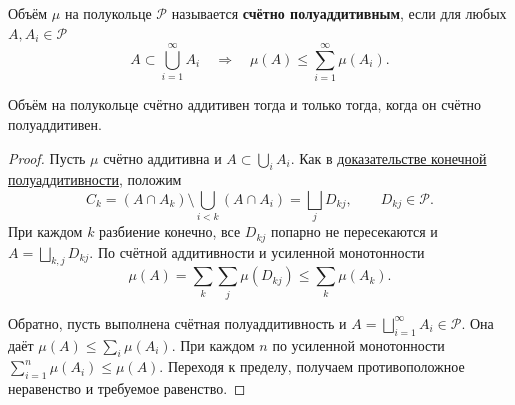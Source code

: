 \label{ticket:19}

\begin{definition}
Объём $\mu$ на полукольце $\mathcal P$ называется \textbf{счётно полуаддитивным}, если для любых $A,A_i\in\mathcal P$
\[
  A\subset\bigcup_{i=1}^{\infty}A_i
  \quad\Longrightarrow\quad
  \mu(A)\le\sum_{i=1}^{\infty}\mu(A_i).
\]
\end{definition}

\begin{theorem}
Объём на полукольце счётно аддитивен тогда и только тогда, когда он счётно полуаддитивен.
\end{theorem}

\begin{proof}
Пусть $\mu$ счётно аддитивна и $A\subset\bigcup_i A_i$.
Как в \hyperref[ticket:18]{доказательстве конечной полуаддитивности}, положим
\[
  C_k=(A\cap A_k)\setminus\bigcup_{i<k}(A\cap A_i)
      =\bigsqcup_j D_{kj},\qquad D_{kj}\in\mathcal P.
\]
При каждом $k$ разбиение конечно, все $D_{kj}$ попарно не пересекаются и $A=\bigsqcup_{k,j}D_{kj}$.
По счётной аддитивности и усиленной монотонности
\[
  \mu(A)=\sum_k\sum_j\mu(D_{kj})\le\sum_k\mu(A_k).
\]

Обратно, пусть выполнена счётная полуаддитивность и $A=\bigsqcup_{i=1}^{\infty}A_i\in\mathcal P$.
Она даёт $\mu(A)\le\sum_i\mu(A_i)$.
При каждом $n$ по усиленной монотонности $\sum_{i=1}^n\mu(A_i)\le\mu(A)$.
Переходя к пределу, получаем противоположное неравенство и требуемое равенство.
\end{proof}
